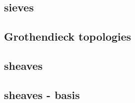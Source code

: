 \subsection{sieves}




\subsection{Grothendieck topologies}




\subsection{sheaves}






\subsection{sheaves - basis}



